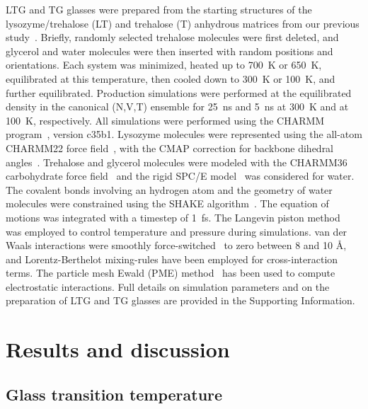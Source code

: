 \documentclass[journal=jpcbfk,manuscript=article]{achemso}
\begin{document}
\begin{singlespacing}
LTG and TG glasses were prepared from the starting structures of the lysozyme/trehalose (LT) and trehalose (T) anhydrous matrices 
from our previous study~\cite{Lerbret2012}. Briefly, randomly selected trehalose molecules were first deleted, and glycerol 
and water molecules were then inserted with random positions and orientations. Each system was minimized, heated up to 700~K 
or 650~K, equilibrated at this temperature, then cooled down to 300~K or 100~K, and further equilibrated. 
Production simulations were performed at the equilibrated density in the canonical (N,V,T) ensemble for 25~ns and 5~ns 
at 300~K and at 100~K, respectively. All simulations were performed using the CHARMM program~\cite{Brooks2009}, version c35b1.
Lysozyme molecules were represented using the all-atom 
CHARMM22 force field~\cite{Mackerell1998}, with the CMAP correction for backbone dihedral angles~\cite{Mackerell2004}. 
Trehalose and glycerol molecules were modeled with the CHARMM36 carbohydrate force field~\cite{Guvench2008,Guvench2009,Hatcher2009} 
and the rigid SPC/E model~\cite{Berendsen1987} was considered for water. The covalent bonds involving an hydrogen atom 
and the geometry of water molecules were constrained using the SHAKE algorithm~\cite{Ryckaert1977}. The equation of motions 
was integrated with a timestep of 1~fs. The Langevin piston method~\cite{Nose1983,Hoover1985} was employed to control temperature 
and pressure during simulations. van der Waals interactions were smoothly force-switched~\cite{Steinbach1994} to zero 
between 8 and 10 \AA \/, and Lorentz-Berthelot mixing-rules have been employed for cross-interaction terms. 
The particle mesh Ewald (PME) method~\cite{Essmann1995} has been used to compute electrostatic interactions. 
Full details on simulation parameters and on the preparation of LTG and TG glasses are provided in the Supporting Information.

\newpage

\section{Results and discussion}

\subsection{Glass transition temperature}


\end{singlespacing}
\end{document}
